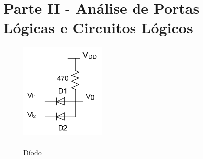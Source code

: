 \documentclass[pdftex,12pt,a4paper]{report}
\begin{document}
\section{Parte II - Análise	de	Portas	Lógicas	e	Circuitos	Lógicos}

\begin{figure}[!htb]
  \includegraphics[width=\linewidth]{Imagens/Diodos.png}
  \caption{\\Díodo}\label{fig:fig_diodo}
\endminipage\hfill
{}

\end{figure}
\end{document}
